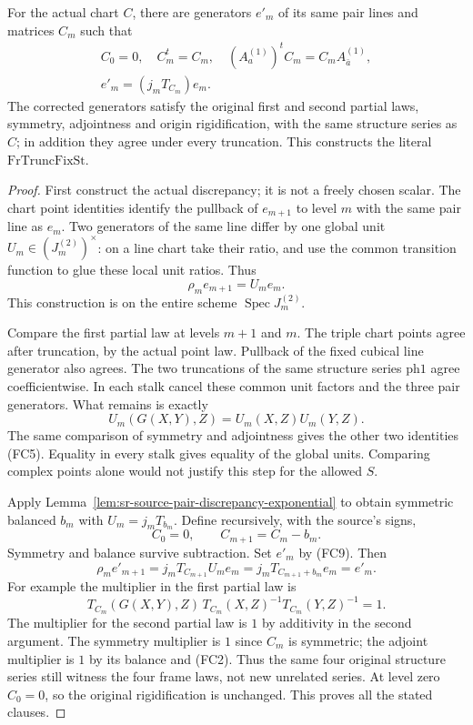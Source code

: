 \begin{srproposition}
\label{prop:sr-source-actual-frame-truncation-fix}
For the actual chart \(C\), there are generators \(e'_m\)
of its same pair lines and matrices \(C_m\) such that
\[
 \begin{gathered}
 C_0=0,\quad C_m^t=C_m,\quad
 (A_a^{(1)})^tC_m=C_mA_{\bar a}^{(1)},\\
                 e'_m=(j_mT_{C_m})e_m.                       \tag{FC9}
 \end{gathered}
\]
The corrected generators satisfy the original first
and second partial laws, symmetry, adjointness and
origin rigidification, with the same structure series
as \(C\); in addition they agree under every truncation.
This constructs the literal \(\mathrm{FrTruncFixSt}\).
\end{srproposition}
\begin{proof}
First construct the actual discrepancy; it is not a
freely chosen scalar.
The chart point identities identify the pullback of
\(e_{m+1}\) to level \(m\) with the same pair line as
\(e_m\).  Two generators of the same line differ by
one global unit \(U_m\in(J_m^{(2)})^\times\):
on a line chart take their ratio, and use the common
transition function to glue these local unit ratios.
Thus
\[
                       \rho_m e_{m+1}=U_me_m.               \tag{FC10}
\]
This construction is on the entire scheme
\(\operatorname{Spec}J_m^{(2)}\).

Compare the first partial law at levels \(m+1\) and \(m\).
The triple chart points agree after truncation, by the
actual point law.  Pullback of the fixed cubical line
generator also agrees.
The two truncations of the same structure series
\(\mathrm{ph1}\) agree coefficientwise.
In each stalk cancel these common unit factors and
the three pair generators.  What remains is exactly
\[
                U_m(G(X,Y),Z)=U_m(X,Z)U_m(Y,Z).
\]
The same comparison of symmetry and adjointness gives
the other two identities (FC5).
Equality in every stalk gives equality of the global
units.  Comparing complex points alone would not
justify this step for the allowed \(S\).

Apply Lemma~\ref{lem:sr-source-pair-discrepancy-exponential}
to obtain symmetric balanced \(b_m\) with \(U_m=j_mT_{b_m}\).
Define recursively, with the source's signs,
\[
                         C_0=0,\qquad C_{m+1}=C_m-b_m.       \tag{FC11}
\]
Symmetry and balance survive subtraction.
Set \(e'_m\) by (FC9).  Then
\[
 \rho_m e'_{m+1}
 =j_mT_{C_{m+1}}U_me_m
 =j_mT_{C_{m+1}+b_m}e_m=e'_m.                               \tag{FC12}
\]
For example the multiplier in the first partial law is
\[
 T_{C_m}(G(X,Y),Z)\,
              T_{C_m}(X,Z)^{-1}T_{C_m}(Y,Z)^{-1}=1.
\]
The multiplier for the second partial law is \(1\)
by additivity in the second argument.
The symmetry multiplier is \(1\) since \(C_m\) is
symmetric; the adjoint multiplier is \(1\) by its
balance and (FC2).
Thus the same four original structure series still
witness the four frame laws, not new unrelated series.
At level zero \(C_0=0\), so the original rigidification
is unchanged.  This proves all the stated clauses.
\end{proof}

